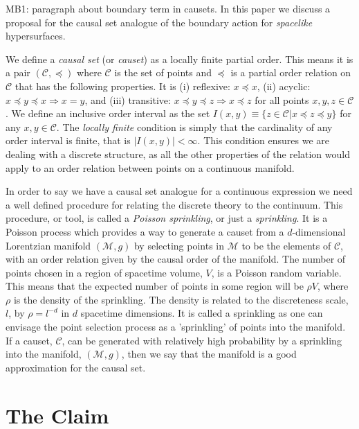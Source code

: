 \documentclass[12pt]{article}
\begin{document}
MB1: paragraph about boundary term in causets. In this paper we discuss a proposal for the  causal set analogue of the boundary action for \emph{spacelike} hypersurfaces. 

We define a \textit{causal set} (or \textit{causet}) as a locally finite partial order. This means it is a pair $(\mathcal{C},\preceq)$ where $\mathcal{C}$ is the set of points and $\preceq$ is a partial order relation on $\mathcal{C}$ that has the following properties. It is (i) reflexive: $x\preceq x$, (ii) acyclic: $x\preceq y\preceq x \Rightarrow x=y$, and (iii) transitive: $x\preceq y\preceq z \Rightarrow x\preceq z$ for all points $x, y, z \in \mathcal{C}$. We define an inclusive order interval as the set $I(x,y)\equiv \lbrace z\in\mathcal{C}|x\preceq z\preceq y\rbrace$ for any $x, y\in\mathcal{C}$. The \textit{locally finite} condition is simply that the cardinality of any order interval is finite, that is $|I(x,y)|<\infty$. This condition ensures we are dealing with a discrete structure, as all the other properties of the relation would apply to an order relation between points on a continuous manifold.

In order to say we have a causal set analogue for a continuous expression we need a well defined procedure for relating the discrete theory to the continuum. This procedure, or tool, is called a \textit{Poisson sprinkling}, or just a \textit{sprinkling}. It is a Poisson process which provides a way to generate a causet from a $d$-dimensional Lorentzian manifold $(\mathcal{M},g)$ by selecting points in $\mathcal{M}$ to be the elements of $\mathcal{C}$, with an order relation given by the causal order of the manifold. The number of points chosen in a region of spacetime volume, $V$, is a Poisson random variable. This means that the expected number of points in some region will be $\rho V$, where $\rho$ is the density of the sprinkling. The density is related to the discreteness scale, $l$, by $\rho=l^{-d}$ in $d$ spacetime dimensions. It is called a sprinkling as one can envisage the point selection process as a 'sprinkling' of points into the manifold. If a causet, $\mathcal{C}$, can be generated with relatively high probability by a sprinkling into the manifold, $(\mathcal{M},g)$, then we say that the manifold is a good approximation for the causal set.

\section{The Claim}
\end{document}
